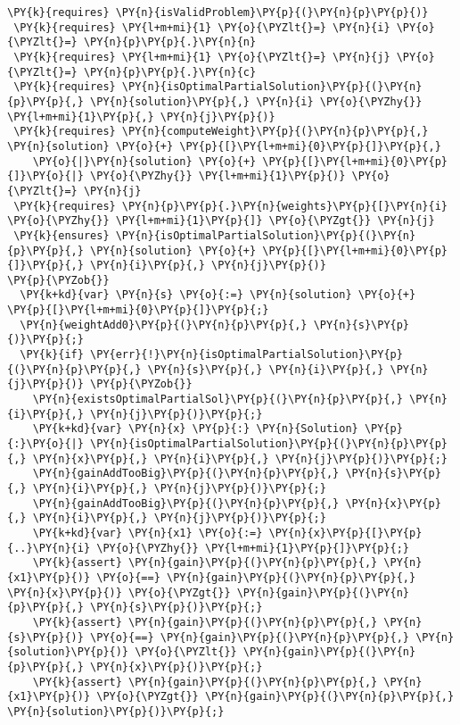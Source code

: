 \begin{sloppypar}
\begin{Verbatim}[commandchars=\\\{\}]
 \PY{k}{requires} \PY{n}{isValidProblem}\PY{p}{(}\PY{n}{p}\PY{p}{)}
 \PY{k}{requires} \PY{l+m+mi}{1} \PY{o}{\PYZlt{}=} \PY{n}{i} \PY{o}{\PYZlt{}=} \PY{n}{p}\PY{p}{.}\PY{n}{n}
 \PY{k}{requires} \PY{l+m+mi}{1} \PY{o}{\PYZlt{}=} \PY{n}{j} \PY{o}{\PYZlt{}=} \PY{n}{p}\PY{p}{.}\PY{n}{c}
 \PY{k}{requires} \PY{n}{isOptimalPartialSolution}\PY{p}{(}\PY{n}{p}\PY{p}{,} \PY{n}{solution}\PY{p}{,} \PY{n}{i} \PY{o}{\PYZhy{}} \PY{l+m+mi}{1}\PY{p}{,} \PY{n}{j}\PY{p}{)}
 \PY{k}{requires} \PY{n}{computeWeight}\PY{p}{(}\PY{n}{p}\PY{p}{,} \PY{n}{solution} \PY{o}{+} \PY{p}{[}\PY{l+m+mi}{0}\PY{p}{]}\PY{p}{,} 
    \PY{o}{|}\PY{n}{solution} \PY{o}{+} \PY{p}{[}\PY{l+m+mi}{0}\PY{p}{]}\PY{o}{|} \PY{o}{\PYZhy{}} \PY{l+m+mi}{1}\PY{p}{)} \PY{o}{\PYZlt{}=} \PY{n}{j} 
 \PY{k}{requires} \PY{n}{p}\PY{p}{.}\PY{n}{weights}\PY{p}{[}\PY{n}{i} \PY{o}{\PYZhy{}} \PY{l+m+mi}{1}\PY{p}{]} \PY{o}{\PYZgt{}} \PY{n}{j}
 \PY{k}{ensures} \PY{n}{isOptimalPartialSolution}\PY{p}{(}\PY{n}{p}\PY{p}{,} \PY{n}{solution} \PY{o}{+} \PY{p}{[}\PY{l+m+mi}{0}\PY{p}{]}\PY{p}{,} \PY{n}{i}\PY{p}{,} \PY{n}{j}\PY{p}{)}
\PY{p}{\PYZob{}}
  \PY{k+kd}{var} \PY{n}{s} \PY{o}{:=} \PY{n}{solution} \PY{o}{+} \PY{p}{[}\PY{l+m+mi}{0}\PY{p}{]}\PY{p}{;}
  \PY{n}{weightAdd0}\PY{p}{(}\PY{n}{p}\PY{p}{,} \PY{n}{s}\PY{p}{)}\PY{p}{;}
  \PY{k}{if} \PY{err}{!}\PY{n}{isOptimalPartialSolution}\PY{p}{(}\PY{n}{p}\PY{p}{,} \PY{n}{s}\PY{p}{,} \PY{n}{i}\PY{p}{,} \PY{n}{j}\PY{p}{)} \PY{p}{\PYZob{}}
    \PY{n}{existsOptimalPartialSol}\PY{p}{(}\PY{n}{p}\PY{p}{,} \PY{n}{i}\PY{p}{,} \PY{n}{j}\PY{p}{)}\PY{p}{;}
    \PY{k+kd}{var} \PY{n}{x} \PY{p}{:} \PY{n}{Solution} \PY{p}{:}\PY{o}{|} \PY{n}{isOptimalPartialSolution}\PY{p}{(}\PY{n}{p}\PY{p}{,} \PY{n}{x}\PY{p}{,} \PY{n}{i}\PY{p}{,} \PY{n}{j}\PY{p}{)}\PY{p}{;}
    \PY{n}{gainAddTooBig}\PY{p}{(}\PY{n}{p}\PY{p}{,} \PY{n}{s}\PY{p}{,} \PY{n}{i}\PY{p}{,} \PY{n}{j}\PY{p}{)}\PY{p}{;}
    \PY{n}{gainAddTooBig}\PY{p}{(}\PY{n}{p}\PY{p}{,} \PY{n}{x}\PY{p}{,} \PY{n}{i}\PY{p}{,} \PY{n}{j}\PY{p}{)}\PY{p}{;}
    \PY{k+kd}{var} \PY{n}{x1} \PY{o}{:=} \PY{n}{x}\PY{p}{[}\PY{p}{..}\PY{n}{i} \PY{o}{\PYZhy{}} \PY{l+m+mi}{1}\PY{p}{]}\PY{p}{;}
    \PY{k}{assert} \PY{n}{gain}\PY{p}{(}\PY{n}{p}\PY{p}{,} \PY{n}{x1}\PY{p}{)} \PY{o}{==} \PY{n}{gain}\PY{p}{(}\PY{n}{p}\PY{p}{,} \PY{n}{x}\PY{p}{)} \PY{o}{\PYZgt{}} \PY{n}{gain}\PY{p}{(}\PY{n}{p}\PY{p}{,} \PY{n}{s}\PY{p}{)}\PY{p}{;}  
    \PY{k}{assert} \PY{n}{gain}\PY{p}{(}\PY{n}{p}\PY{p}{,} \PY{n}{s}\PY{p}{)} \PY{o}{==} \PY{n}{gain}\PY{p}{(}\PY{n}{p}\PY{p}{,} \PY{n}{solution}\PY{p}{)} \PY{o}{\PYZlt{}} \PY{n}{gain}\PY{p}{(}\PY{n}{p}\PY{p}{,} \PY{n}{x}\PY{p}{)}\PY{p}{;}
    \PY{k}{assert} \PY{n}{gain}\PY{p}{(}\PY{n}{p}\PY{p}{,} \PY{n}{x1}\PY{p}{)} \PY{o}{\PYZgt{}} \PY{n}{gain}\PY{p}{(}\PY{n}{p}\PY{p}{,} \PY{n}{solution}\PY{p}{)}\PY{p}{;}

\end{Verbatim}
\end{sloppypar}
